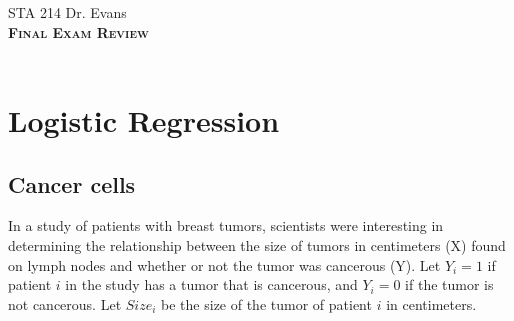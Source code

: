 \documentclass[11pt]{article}
\newcommand{\ttl}[1]{ \textsc{{\LARGE \textbf{{\color{black} #1} } }}}
\begin{document}
STA 214 \hfill Dr. Evans \\

\ttl{Final Exam Review\\ } \\

\section{Logistic Regression}

\subsection{Cancer cells}

In a study of patients with breast tumors, scientists were interesting in determining the relationship between the size of tumors in centimeters (X) found on lymph nodes and whether or not the tumor was cancerous (Y). Let $Y_i = 1$ if patient $i$ in the study has a tumor that is cancerous, and $Y_i = 0$ if the tumor is not cancerous. Let $Size_i$ be the size of the tumor of patient $i$ in centimeters. 

\vspace{.2cm}
\end{document}
